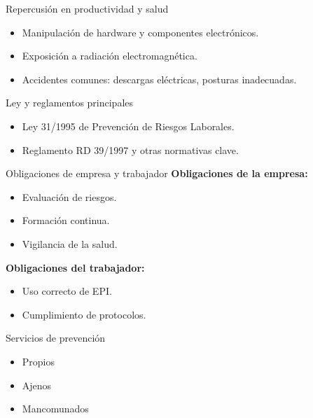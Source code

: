 \documentclass{beamer}
\begin{document}
\begin{frame}{Repercusión en productividad y salud}
    \begin{itemize}
        \item Manipulación de hardware y componentes electrónicos.
        \item Exposición a radiación electromagnética.
        \item Accidentes comunes: descargas eléctricas, posturas inadecuadas.
    \end{itemize}
\end{frame}

\begin{frame}{Ley y reglamentos principales}
    \begin{itemize}
        \item Ley 31/1995 de Prevención de Riesgos Laborales.
        \item Reglamento RD 39/1997 y otras normativas clave.
    \end{itemize}
\end{frame}

\begin{frame}{Obligaciones de empresa y trabajador}
    \textbf{Obligaciones de la empresa:}
    \begin{itemize}
        \item Evaluación de riesgos.
        \item Formación continua.
        \item Vigilancia de la salud.
    \end{itemize}
    \textbf{Obligaciones del trabajador:}
    \begin{itemize}
        \item Uso correcto de EPI.
        \item Cumplimiento de protocolos.
    \end{itemize}
\end{frame}

\begin{frame}{Servicios de prevención}
    \begin{itemize}
        \item Propios
        \item Ajenos
        \item Mancomunados
    \end{itemize}
\end{frame}
\end{document}
